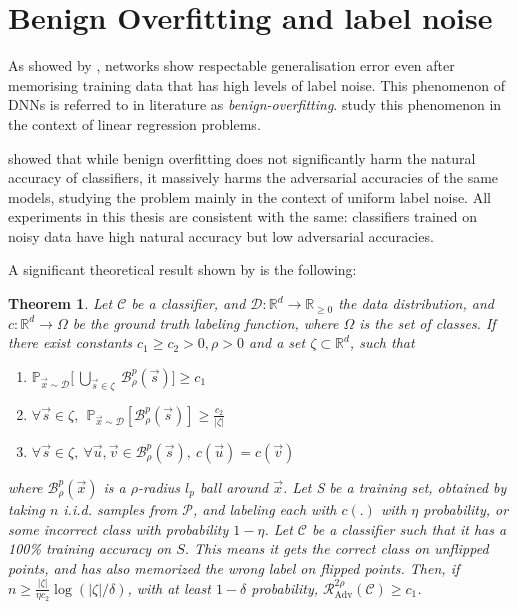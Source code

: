 \documentclass{ociamthesis}
\newtheorem{theorem}{Theorem}
\begin{document}


\section{Benign Overfitting and label noise}
\label{section:benign}
As showed by \citet{DBLP:journals/cacm/ZhangBHRV21}, networks show respectable
generalisation error even after memorising training data that has high levels of
label noise. This phenomenon of DNNs is referred to in literature as
\emph{benign-overfitting}. \citet{bartlett2020benign} study this phenomenon in
the context of linear regression problems.

\citet{sanyal2021how} showed that while benign overfitting does not
significantly harm the natural accuracy of classifiers, it massively harms the
adversarial accuracies of the same models, studying the problem mainly in the
context of uniform label noise. All experiments in this thesis are consistent
with the same: classifiers trained on noisy data have high natural accuracy but
low adversarial accuracies.

A significant theoretical result shown by \citet{sanyal2021how} is the
following:

\begin{theorem}
    \label{theorem:how-benign-bo}
    Let $\mathcal{C}$ be a classifier, and $\mathcal{D}: \mathbb{R}^d \to
    \mathbb{R}_{\geq 0}$ the data distribution, and $c: \mathbb{R}^d \to \Omega$
    be the ground truth labeling function, where $\Omega$ is the set of classes.
    If there exist constants $c_1 \geq c_2 > 0, \rho > 0$ and a set $\zeta
    \subset \mathbb{R}^d$, such that
    \begin{enumerate}
        \item $\mathbb{P}_{\vec{x} \sim \mathcal{D}} \bigg [~\underset{\vec{s}
        \in \zeta}{\bigcup}~\mathcal{B}_\rho^p(\vec{s}) \bigg ] \geq c_1$
        \item $\forall \vec{s} \in \zeta,~~ \mathbb{P}_{\vec{x} \sim
        \mathcal{D}} [\mathcal{B}_\rho^p(\vec{s})] \geq \frac{c_2}{|\zeta|}$
        \item $\forall \vec{s} \in \zeta,~\forall \vec{u}, \vec{v} \in
        \mathcal{B}_\rho^p(\vec{s}),~c(\vec{u}) = c(\vec{v})$
    \end{enumerate}
    where $\mathcal{B}^p_\rho(\vec{x})$ is a $\rho$-radius $l_p$ ball around
    $\vec{x}$. Let S be a training set, obtained by taking $n$ i.i.d. samples
    from $\mathcal{P}$, and labeling each with $c(.)$ with $\eta$ probability,
    or some incorrect class with probability $1-\eta$. Let $\mathcal{C}$ be a
    classifier such that it has a 100\% training accuracy on $S$. This means it
    gets the correct class on unflipped points, and has also memorized the wrong
    label on flipped points. Then, if $n \geq \frac{|\zeta|}{\eta c_2} \log
    (|\zeta|/\delta)$, with at least $1-\delta$ probability,
    $\mathcal{R}_{\text{Adv}}^{2\rho}(\mathcal{C}) \geq c_1$.
\end{theorem}
\end{document}
